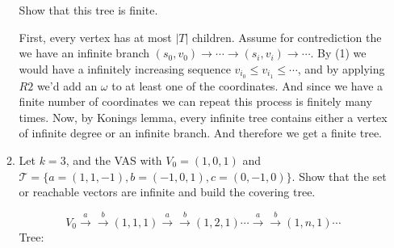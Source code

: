 \documentclass[a4paper,11pt]{exam}
\begin{document}
\begin{questions}
\begin{enumerate}
\begin{enumerate}
				Show that this tree is finite.
				
				\begin{solution}
					First, every vertex has at most $|T|$ children. Assume for contrediction the we have an infinite branch $(s_0,v_0) \rightarrow \cdots \rightarrow (s_i,v_i) \rightarrow \cdots$. By (1) we would have a infinitely increasing sequence $v_{i_0} \leq v_{i_1} \leq \cdots$, and by applying $R2$ we'd add an $\omega$ to at least one of the coordinates. And since we have a finite number of coordinates we can repeat this process is finitely many times. 
					Now, by Konings lemma, every infinite tree contains either a vertex of infinite degree or an infinite branch. And therefore we get a finite tree.
					
				\end{solution}
				
				\item Let $k=3$, and the VAS with $V_0 = (1,0,1)$
				and $\mathcal{T} = \{a=(1,1,-1), b=(-1,0,1), c=(0,-1,0) \}$. Show that the set or reachable vectors are infinite and build the covering tree.
				
				\begin{solution}
					\[
					V_0 \xrightarrow{a}\xrightarrow{b} (1,1,1) 
					\xrightarrow{a}\xrightarrow{b} (1,2,1) \cdots
					\xrightarrow{a}\xrightarrow{b} (1,n,1) \cdots
					\]
					Tree:
					

\end{solution}
\end{enumerate}
\end{enumerate}
\end{questions}
\end{document}
